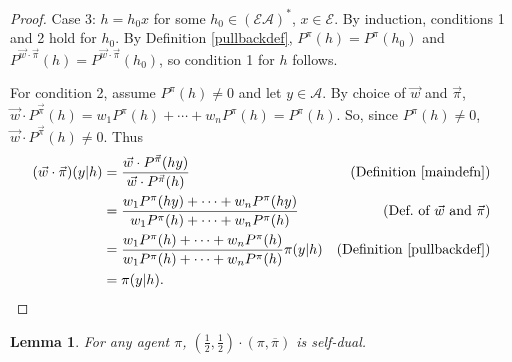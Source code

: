 \documentclass[twoside]{article}
\newtheorem{lemma}[theorem]{Lemma}
\begin{document}
\begin{proof}
    Case 3: $h=h_0x$ for some $h_0\in (\mathcal E\mathcal A)^*$,
        $x\in\mathcal E$.
        By induction, conditions 1 and 2 hold for $h_0$.
        By Definition \ref{pullbackdef},
        $P^\pi(h)=P^\pi(h_0)$ and
        $P^{\vec w\cdot\vec\pi}(h)=P^{\vec w\cdot\vec\pi}(h_0)$,
        so condition 1 for $h$ follows.

        For condition 2,
        assume $P^\pi(h)\not=0$ and let $y\in\mathcal A$.
        By choice of $\vec w$ and $\vec\pi$,
        $\vec w\cdot{P^{\vec\pi}}(h)=w_1P^\pi(h)+\cdots+w_nP^\pi(h)=P^\pi(h)$.
        So, since $P^\pi(h)\not=0$, $\vec w\cdot{P^{\vec\pi}}(h)\not=0$.
        Thus
        \begin{align*}
            (\vec w\cdot\vec\pi)(y|h)
                &= \frac{\vec w\cdot {P^{\vec\pi}}(hy)}{\vec w\cdot{P^{\vec\pi}}(h)}
                    &\mbox{(Definition \ref{maindefn})}\\
                &= \frac{w_1P^\pi(hy)+\cdots+w_nP^\pi(hy)}
                    {w_1P^\pi(h)+\cdots+w_nP^\pi(h)}
                    &\mbox{(Def.\ of $\vec w$ and $\vec\pi$)}\\
                &= \frac{w_1P^\pi(h)+\cdots+w_nP^\pi(h)}{w_1P^\pi(h)+\cdots+w_nP^\pi(h)}
                    \pi(y|h)
                    &\mbox{(Definition \ref{pullbackdef})}\\
                &= \pi(y|h).
        \end{align*}
\end{proof}

\begin{lemma}
\label{reflectionmakesjanuslemma}
    For any agent $\pi$,
    $(\frac12,\frac12)\cdot(\pi,\overline\pi)$ is self-dual.
\end{lemma}
\end{document}
